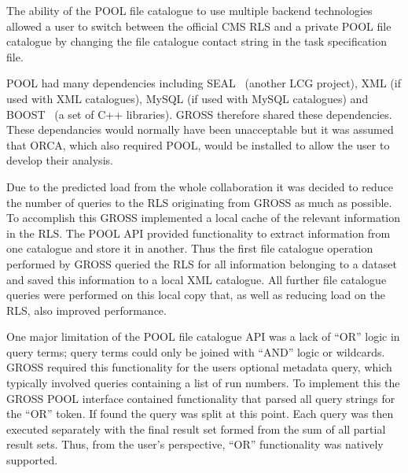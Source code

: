 The ability of the POOL file catalogue to use multiple backend technologies allowed a user to switch between the official CMS RLS and a private POOL file catalogue by changing the file catalogue contact string in the task specification file.

POOL had many dependencies including SEAL~\cite{SEAL} (another LCG project), XML (if used with XML catalogues), MySQL (if used with MySQL catalogues) and BOOST~\cite{BOOST} (a set of C++ libraries). GROSS therefore shared these dependencies. These dependancies would normally have been unacceptable but it was assumed that ORCA, which also required POOL, would be installed to allow the user to develop their analysis. 

Due to the predicted load from the whole collaboration it was decided to reduce the number of queries to the RLS originating from GROSS as much as possible. To accomplish this GROSS implemented a local cache of the relevant information in the RLS. The POOL API provided functionality to extract information from one catalogue and store it in another. Thus the first file catalogue operation performed by GROSS queried the RLS for all information belonging to a dataset and saved this information to a local XML catalogue. All further file catalogue queries were performed on this local copy that, as well as reducing load on the RLS, also improved performance.


One major limitation of the POOL file catalogue API was a lack of ``OR'' logic in query terms; query terms could only be joined with ``AND'' logic or wildcards. GROSS required this functionality for the users optional metadata query, which typically involved queries containing a list of run numbers. To implement this the GROSS POOL interface contained functionality that parsed all query strings for the ``OR'' token. If found the query was split at this point. Each query was then executed separately with the final result set formed from the sum of all partial result sets. Thus, from the user's perspective, ``OR'' functionality was natively supported.


